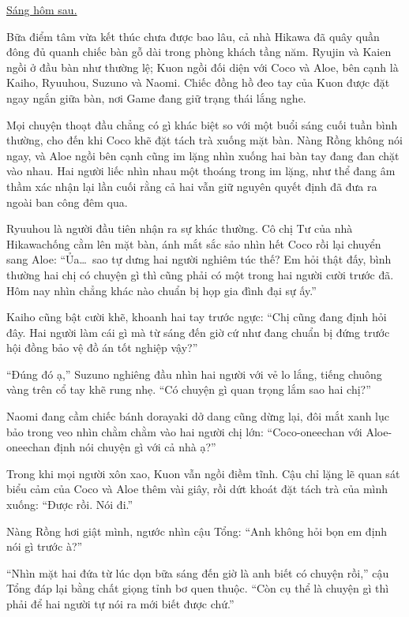 ﻿\documentclass[../main.tex]{subfiles}
\begin{document}
\ct

\begin{center}
  \uline{Sáng hôm sau.}
\end{center}

Bữa điểm tâm vừa kết thúc chưa được bao lâu, cả nhà Hikawa đã quây quần đông đủ quanh chiếc bàn gỗ dài trong phòng khách tầng năm. Ryujin và Kaien ngồi ở đầu bàn như thường lệ; Kuon ngồi đối diện với Coco và Aloe, bên cạnh là Kaiho, Ryuuhou, Suzuno và Naomi. Chiếc đồng hồ đeo tay của Kuon được đặt ngay ngắn giữa bàn, nơi Game đang giữ trạng thái lắng nghe.

Mọi chuyện thoạt đầu chẳng có gì khác biệt so với một buổi sáng cuối tuần bình thường, cho đến khi Coco khẽ đặt tách trà xuống mặt bàn. Nàng Rồng không nói ngay, và Aloe ngồi bên cạnh cũng im lặng nhìn xuống hai bàn tay đang đan chặt vào nhau. Hai người liếc nhìn nhau một thoáng trong im lặng, như thể đang âm thầm xác nhận lại lần cuối rằng cả hai vẫn giữ nguyên quyết định đã đưa ra ngoài ban công đêm qua.

Ryuuhou là người đầu tiên nhận ra sự khác thường. Cô chị Tư của nhà Hikawachống cằm lên mặt bàn, ánh mắt sắc sảo nhìn hết Coco rồi lại chuyển sang Aloe: ``Ủa\dots\ sao tự dưng hai người nghiêm túc thế? Em hỏi thật đấy, bình thường hai chị có chuyện gì thì cũng phải có một trong hai người cười trước đã. Hôm nay nhìn chẳng khác nào chuẩn bị họp gia đình đại sự ấy.''

Kaiho cũng bật cười khẽ, khoanh hai tay trước ngực: ``Chị cũng đang định hỏi đây. Hai người làm cái gì mà từ sáng đến giờ cứ như đang chuẩn bị đứng trước hội đồng bảo vệ đồ án tốt nghiệp vậy?''

``Đúng đó ạ,'' Suzuno nghiêng đầu nhìn hai người với vẻ lo lắng, tiếng chuông vàng trên cổ tay khẽ rung nhẹ. ``Có chuyện gì quan trọng lắm sao hai chị?''

Naomi đang cầm chiếc bánh dorayaki dở dang cũng dừng lại, đôi mắt xanh lục bảo trong veo nhìn chằm chằm vào hai người chị lớn: ``Coco-oneechan với Aloe-oneechan định nói chuyện gì với cả nhà ạ?''

Trong khi mọi người xôn xao, Kuon vẫn ngồi điềm tĩnh. Cậu chỉ lặng lẽ quan sát biểu cảm của Coco và Aloe thêm vài giây, rồi dứt khoát đặt tách trà của mình xuống: ``Được rồi. Nói đi.''

Nàng Rồng hơi giật mình, ngước nhìn cậu Tổng: ``Anh không hỏi bọn em định nói gì trước à?''

``Nhìn mặt hai đứa từ lúc dọn bữa sáng đến giờ là anh biết có chuyện rồi,'' cậu Tổng đáp lại bằng chất giọng tỉnh bơ quen thuộc. ``Còn cụ thể là chuyện gì thì phải để hai người tự nói ra mới biết được chứ.''
\end{document}

